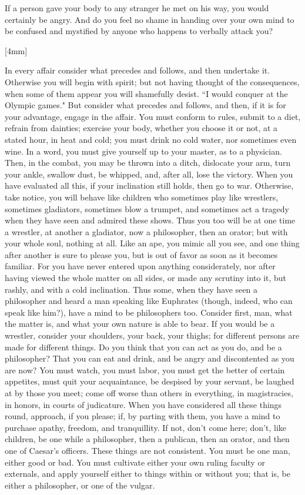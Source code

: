 \documentclass[a4paper,12pt]{book}
\newcounter{original_page_count}
\newcommand{\margincounter}{
    \stepcounter{original_page_count}
    \marginnote{
        \color{red}
        \small{
            \roman{original_page_count}
        }
    }[4mm]
}
\begin{document}
If a person gave your body to any stranger he met on his way,
you would certainly be angry. And do you feel no shame in handing
over your own mind to be confused and mystified by anyone who happens
to verbally attack you? 

\margincounter{}

In every affair consider what precedes and follows, and then undertake
it. Otherwise you will begin with spirit; but not having thought of
the consequences, when some of them appear you will shamefully desist.
``I would conquer at the Olympic games." But consider what precedes
and follows, and then, if it is for your advantage, engage in the
affair. You must conform to rules, submit to a diet, refrain from
dainties; exercise your body, whether you choose it or not, at a stated
hour, in heat and cold; you must drink no cold water, nor sometimes
even wine. In a word, you must give yourself up to your master, as
to a physician. Then, in the combat, you may be thrown into a ditch,
dislocate your arm, turn your ankle, swallow dust, be whipped, and,
after all, lose the victory. When you have evaluated all this, if
your inclination still holds, then go to war. Otherwise, take notice,
you will behave like children who sometimes play like wrestlers, sometimes
gladiators, sometimes blow a trumpet, and sometimes act a tragedy
when they have seen and admired these shows. Thus you too will be
at one time a wrestler, at another a gladiator, now a philosopher,
then an orator; but with your whole soul, nothing at all. Like an
ape, you mimic all you see, and one thing after another is sure to
please you, but is out of favor as soon as it becomes familiar. For
you have never entered upon anything considerately, nor after having
viewed the whole matter on all sides, or made any scrutiny into it,
but rashly, and with a cold inclination. Thus some, when they have
seen a philosopher and heard a man speaking like Euphrates (though,
indeed, who can speak like him?), have a mind to be philosophers too.
Consider first, man, what the matter is, and what your own nature
is able to bear. If you would be a wrestler, consider your shoulders,
your back, your thighs; for different persons are made for different
things. Do you think that you can act as you do, and be a philosopher?
That you can eat and drink, and be angry and discontented as you are
now? You must watch, you must labor, you must get the better of certain
appetites, must quit your acquaintance, be despised by your servant,
be laughed at by those you meet; come off worse than others in everything,
in magistracies, in honors, in courts of judicature. When you have
considered all these things round, approach, if you please; if, by
parting with them, you have a mind to purchase apathy, freedom, and
tranquillity. If not, don't come here; don't, like children, be one
while a philosopher, then a publican, then an orator, and then one
of Caesar's officers. These things are not consistent. You must be
one man, either good or bad. You must cultivate either your own ruling
faculty or externals, and apply yourself either to things within or
without you; that is, be either a philosopher, or one of the vulgar.
\end{document}
